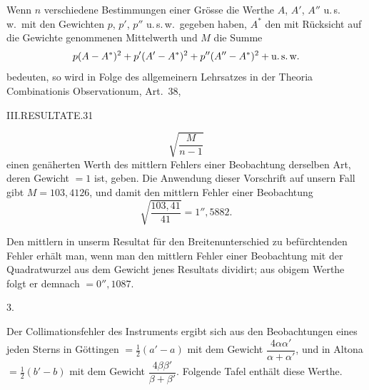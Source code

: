 Wenn $n$ verschiedene Bestimmungen einer Grösse die Werthe $A$, $A'$, $A''$
u.\,s.\,w.\ mit den Gewichten $p$, $p'$, $p''$ u.\,s.\,w.\ gegeben haben, $A^\ast$ den mit Rücksicht
auf die Gewichte genommenen Mittelwerth und $M$ die Summe
\[
p(A-A^\ast)^2+p'(A'-A^\ast)^2+p''(A''-A^\ast)^2+\text{u.\,s.\,w.}
\]
bedeuten, so wird in Folge des allgemeinern Lehrsatzes in der Theoria Combinationis
Observationum, Art.\ 38,

\clearpage
\noindent\mbox{}\hfill III.\quad RESULTATE.\hfill 31\par
\[
\sqrt{\frac{M}{n-1}}
\]
einen genäherten Werth des mittlern Fehlers einer Beobachtung derselben
Art, deren Gewicht $=1$ ist, geben. Die Anwendung dieser Vorschrift auf
unsern Fall gibt $M=103{,}4126$, und damit den mittlern Fehler einer Beobachtung
\[
\sqrt{\frac{103{,}41}{41}}=1''{,}5882.
\]

Den mittlern in unserm Resultat für den Breitenunterschied zu befürchtenden
Fehler erhält man, wenn man den mittlern Fehler einer Beobachtung
mit der Quadratwurzel aus dem Gewicht jenes Resultats dividirt; aus obigem
Werthe folgt er demnach $=0''{,}1087$.

\begin{center}3.\end{center}

Der Collimationsfehler des Instruments ergibt sich aus den Beobachtungen
eines jeden Sterns in Göttingen $=\frac12(a'-a)$ mit dem Gewicht $\dfrac{4\alpha\alpha'}{\alpha+\alpha'}$, und in
Altona $=\frac12(b'-b)$ mit dem Gewicht $\dfrac{4\beta\beta'}{\beta+\beta'}$. Folgende Tafel enthält diese
Werthe.

